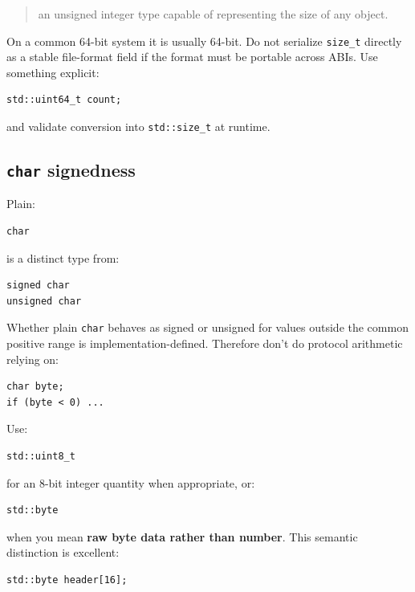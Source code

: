 \begin{quote}
an unsigned integer type capable of representing the size of any object.
\end{quote}

On a common 64-bit system it is usually 64-bit. Do not serialize \texttt{size\_t} directly as a stable file-format field if the format must be portable across ABIs. Use something explicit:

\begin{verbatim}
std::uint64_t count;
\end{verbatim}

and validate conversion into \texttt{std::size\_t} at runtime.

\subsection{\texorpdfstring{\texttt{char} signedness}{char signedness}}\label{05-engine-i-ch002-char-signedness}

\hypertarget{05-engine-i-ch002-char-signedness}{}

Plain:

\begin{verbatim}
char
\end{verbatim}

is a distinct type from:

\begin{verbatim}
signed char
unsigned char
\end{verbatim}

Whether plain \texttt{char} behaves as signed or unsigned for values outside the common positive range is implementation-defined. Therefore don't do protocol arithmetic relying on:

\begin{verbatim}
char byte;
if (byte < 0) ...
\end{verbatim}

Use:

\begin{verbatim}
std::uint8_t
\end{verbatim}

for an 8-bit integer quantity when appropriate, or:

\begin{verbatim}
std::byte
\end{verbatim}

when you mean \textbf{raw byte data rather than number}. This semantic distinction is excellent:

\begin{verbatim}
std::byte header[16];
\end{verbatim}


